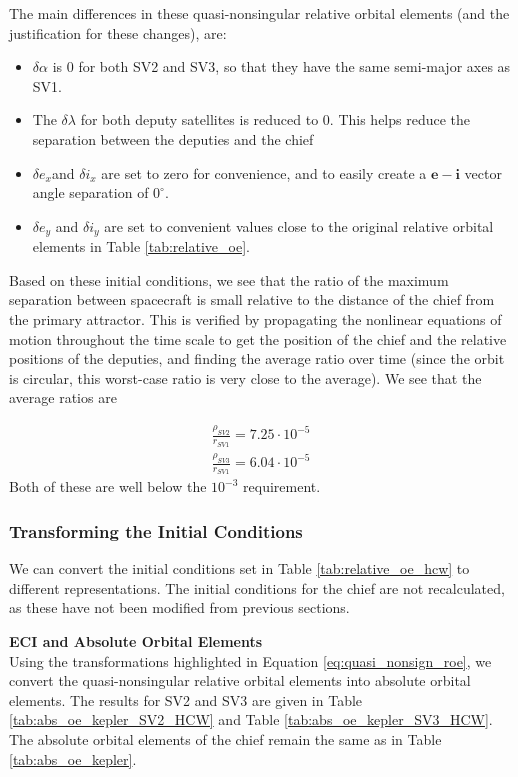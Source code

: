 The main differences in these quasi-nonsingular relative orbital elements (and the justification for these changes), are:
\begin{itemize}
    \item $\delta\alpha$ is 0 for both SV2 and SV3, so that they have the same semi-major axes as SV1.
    \item The $\delta\lambda$ for both deputy satellites is reduced to 0. This helps reduce the separation between the deputies and the chief
    \item $\delta e_x$and $\delta i_x$ are set to zero for convenience, and to easily create a $\boldsymbol{e}-\boldsymbol{i}$ vector angle separation of $0^\circ$.
    \item $\delta e_y$ and $\delta i_y$ are set to convenient values close to the original relative orbital elements in Table \ref{tab:relative_oe}.
\end{itemize}

Based on these initial conditions, we see that the ratio of the maximum separation between spacecraft is small relative to the distance of the chief from the primary attractor. This is verified by propagating the nonlinear equations of motion throughout the time scale to get the position of the chief and the relative positions of the deputies, and finding the average ratio over time (since the orbit is circular, this worst-case ratio is very close to the average). We see that the average ratios are

\begin{align}
    \frac{\rho_{SV2}}{r_{SV1}} = 7.25\cdot10^{-5} \\
    \frac{\rho_{SV3}}{r_{SV1}} = 6.04\cdot10^{-5}
\end{align}
Both of these are well below the $10^{-3}$ requirement.

\subsubsection{Transforming the Initial Conditions} \label{sec:hcw_initial_conditions}
We can convert the initial conditions set in Table \ref{tab:relative_oe_hcw} to different representations. The initial conditions for the chief are not recalculated, as these have not been modified from previous sections.

\textbf{ECI and Absolute Orbital Elements} \\
Using the transformations highlighted in Equation \ref{eq:quasi_nonsign_roe}, 
we convert the quasi-nonsingular relative orbital elements into absolute orbital elements. The results for SV2 and SV3 are given in Table \ref{tab:abs_oe_kepler_SV2_HCW} and Table \ref{tab:abs_oe_kepler_SV3_HCW}. The absolute orbital elements of the chief remain the same as in Table \ref{tab:abs_oe_kepler}.

